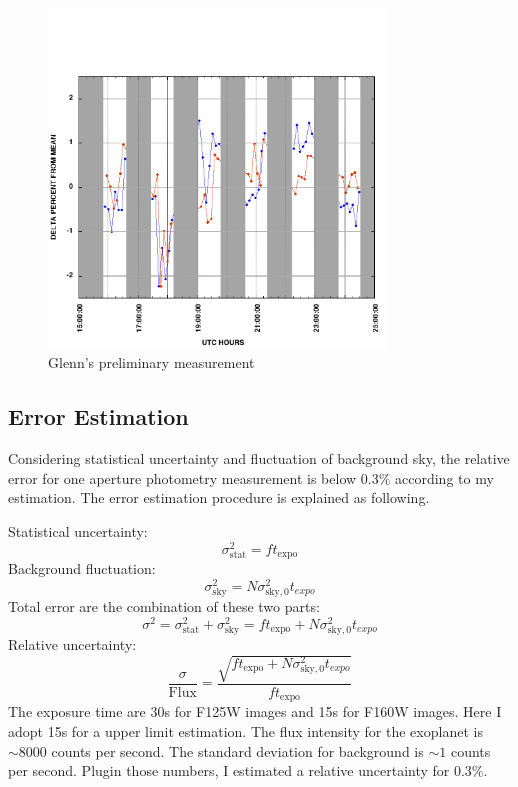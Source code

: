 \documentclass[paper=letter, fontsize=11pt]{scrartcl} %
\numberwithin{equation}{section} %
\numberwithin{figure}{section} %
\numberwithin{table}{section} %
\begin{document}
\begin{figure}
  \centering
    \centering
    \includegraphics[width=0.8\textwidth]{ABPIC_DELTA_PERCENT_INITIAL}
    \caption{Glenn's preliminary measurement}
    \label{fig:glenn}
  \end{figure}

\subsection{Error Estimation}
Considering statistical uncertainty and fluctuation of background sky,
the relative error for one aperture photometry measurement is below
0.3\% according to my estimation. The error estimation procedure is
explained as following.\par

Statistical uncertainty:
\begin{equation}
  \sigma_{\mathrm{stat}}^{2}=ft_{\mathrm{expo}}
\end{equation}
Background fluctuation:
\begin{equation}
  \sigma_{\mathrm{sky}}^{2}=N\sigma_{\mathrm{sky,0}}^{2}t_{expo}
\end{equation}
Total error are the combination of these two parts:
\begin{equation}
  \sigma^{2} = \sigma_{\mathrm{stat}}^{2}+\sigma_{\mathrm{sky}}^{2}=ft_{\mathrm{expo}}+N\sigma_{\mathrm{sky,0}}^{2}t_{expo}
\end{equation}
Relative uncertainty:
\begin{equation}
  \frac{\sigma}{\mathrm{Flux}} = \frac{\sqrt{ft_{\mathrm{expo}}+N\sigma_{\mathrm{sky,0}}^{2}t_{expo}}}{ft_{\mathrm{expo}}}
\end{equation}
The exposure time are 30s for F125W images and 15s for F160W
images. Here I adopt 15s for a upper limit estimation. The flux
intensity for the exoplanet is $\sim 8000$ counts per second. The
standard deviation for background is $\sim 1$ counts per
second. Plugin those numbers, I estimated a relative uncertainty for 0.3\%.
\end{document}
